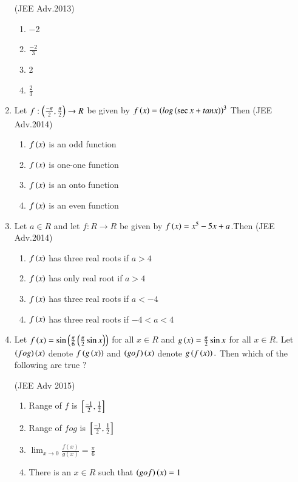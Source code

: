 \documentclass[journal,12pt,twocolumn]{IEEEtran}
\theoremstyle{remark}
\begin{document}
\begin{enumerate}[start=2]
\hfill(JEE Adv.2013)
\begin{multicols}{4}
\begin{enumerate}
\item $-$2
\item $\frac{-2}{3}$
\item 2
\item$\frac{2}{3}$
\end{enumerate}
\end{multicols}
\item Let $f:\left(\frac{-\pi}{2},\frac{\pi}{2}\right)\rightarrow{R}$ be given by $f\left(x\right)=\left(log\left(\sec{x}+tan{x}\right)\right)^3$ Then
\hfill(JEE Adv.2014)
\begin{enumerate} 
\item$f\left(x\right)$ is an odd function
\item$f\left(x\right)$ is one-one function
\item$f\left(x\right)$ is an onto function
\item$f\left(x\right)$ is an even function
\end{enumerate}
\item Let $a \in R$ and let $f:R\rightarrow{R}$ be given by $f\left(x\right)=x^5-5x+a$.Then
\hfill(JEE Adv.2014)
\begin{enumerate} 
\item $f\left(x\right)$ has three real roots if $a>4$
\item $f\left(x\right)$ has only real root if $a>4$
\item $f\left(x\right)$ has three real roots if $a<-4$
\item $f\left(x\right)$ has three real roots if $-4<a<4$
\end{enumerate}
\item Let $f\left(x\right)=\sin\left(\frac{\pi}{6}\left(\frac{\pi}{2}\sin{x}\right)\right)$ for all $x \in R $ and $g\left(x\right)=\frac{\pi}{2}\sin{x}$ for all $x \in R$. Let $\left(fog\right)\left(x\right)$ denote $f\left(g\left(x\right)\right)$ and $\left(gof\right)\left(x\right)$ denote $g\left(f\left(x\right)\right).$ Then which of the following are true $?$

\hfill(JEE Adv 2015)
\begin{enumerate} 
\item Range of $f$ is ${}\left[\frac{-1}{2},\frac{1}{2}\right]$
\item Range of $fog$ is ${}\left[\frac{-1}{2},\frac{1}{2}\right]$
\item $\lim_{x\rightarrow{0}}\frac{f(x)}{g(x)}=\frac{\pi}{6}$
\item There is an $x \in R$ such that $\left(gof\right)\left(x\right)=1$
\end{enumerate}
\end{enumerate}
\end{document}
